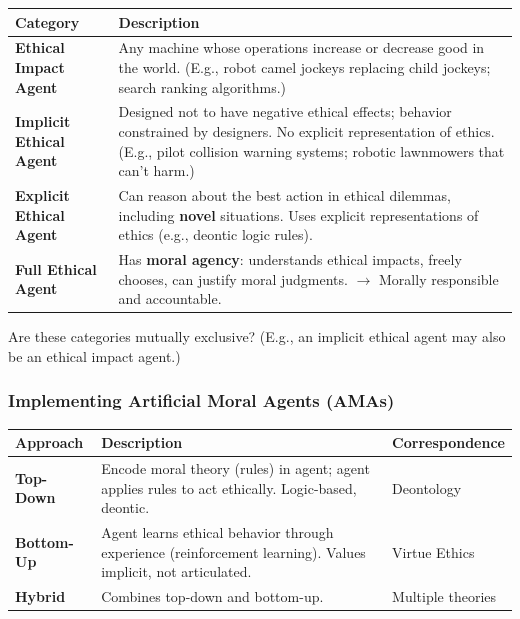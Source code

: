 \begin{center}
\renewcommand{\arraystretch}{1.3}
\begin{tabular}{@{} l p{9cm} @{}}
\toprule
\textbf{Category} & \textbf{Description} \\
\midrule
\textbf{Ethical Impact Agent} & Any machine whose operations increase or decrease good in the world. (E.g., robot camel jockeys replacing child jockeys; search ranking algorithms.) \\
\textbf{Implicit Ethical Agent} & Designed not to have negative ethical effects; behavior constrained by designers. No explicit representation of ethics. (E.g., pilot collision warning systems; robotic lawnmowers that can't harm.) \\
\textbf{Explicit Ethical Agent} & Can reason about the best action in ethical dilemmas, including \textbf{novel} situations. Uses explicit representations of ethics (e.g., deontic logic rules). \\
\textbf{Full Ethical Agent} & Has \textbf{moral agency}: understands ethical impacts, freely chooses, can justify moral judgments. $\to$ Morally responsible and accountable. \\
\bottomrule
\end{tabular}
\end{center}

\begin{tipbox}
Are these categories mutually exclusive? (E.g., an implicit ethical agent may also be an ethical impact agent.)
\end{tipbox}

\bigseparator

\subsubsection{Implementing Artificial Moral Agents (AMAs)}

\begin{center}
\renewcommand{\arraystretch}{1.3}
\begin{tabular}{@{} l p{4.5cm} p{5cm} @{}}
\toprule
\textbf{Approach} & \textbf{Description} & \textbf{Correspondence} \\
\midrule
\textbf{Top-Down} & Encode moral theory (rules) in agent; agent applies rules to act ethically. Logic-based, deontic. & Deontology \\
\textbf{Bottom-Up} & Agent learns ethical behavior through experience (reinforcement learning). Values implicit, not articulated. & Virtue Ethics \\
\textbf{Hybrid} & Combines top-down and bottom-up. & Multiple theories \\
\bottomrule
\end{tabular}
\end{center}


